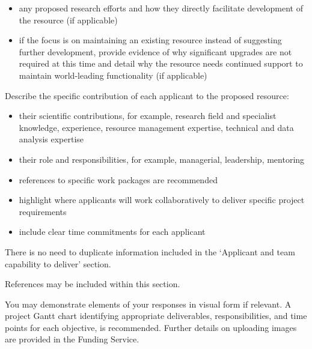 \documentclass[11pt]{article}
\newenvironment{instruction}{%
    \begin{tcolorbox}[breakable,colback=red!5,colframe=red,title=Instruction]%
	}{%
    	\end{tcolorbox}%
	}
\begin{document}
\begin{instruction}
\begin{itemize}
	\item any proposed research efforts and how they directly facilitate
	development of the resource (if applicable)

	\item if the focus is on maintaining an existing resource instead of
	suggesting further development, provide evidence of why significant
	upgrades are not required at this time and detail why the resource needs
	continued support to maintain world-leading functionality (if applicable)

\end{itemize}

Describe the specific contribution of each applicant to the proposed resource:

\begin{itemize}

	\item their scientific contributions, for example, research field and
	specialist knowledge, experience, resource management expertise, technical
	and data analysis expertise

	\item their role and responsibilities, for example, managerial, leadership,
	mentoring

	\item references to specific work packages are recommended

	\item highlight where applicants will work collaboratively to deliver
	specific project requirements

	\item include clear time commitments for each applicant

\end{itemize}

There is no need to duplicate information included in the ‘Applicant and team
capability to deliver’ section.

References may be included within this section.

You may demonstrate elements of your responses in visual form if relevant. A
project Gantt chart identifying appropriate deliverables, responsibilities, and
time points for each objective, is recommended. Further details on uploading
images are provided in the Funding Service.

\end{instruction}

\begin{bibunit}[apalike]

\pagebreak
\putbib
\end{bibunit}
\end{document}
